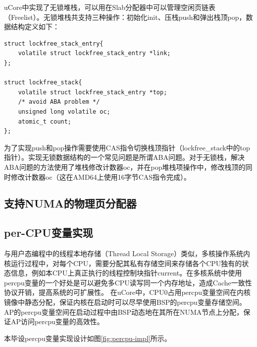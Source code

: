 uCore中实现了无锁堆栈，可以用在Slab分配器中可以管理空闲页链表（Freelist）。无锁堆栈共支持三种操作：初始化init、压栈push和弹出栈顶pop，数据结构定义如下：

\begin{lstlisting}
struct lockfree_stack_entry{
	volatile struct lockfree_stack_entry *link;
};

struct lockfree_stack{
	volatile struct lockfree_stack_entry *top;
	/* avoid ABA problem */
	unsigned long volatile oc;
	atomic_t count;
};
\end{lstlisting}

为了实现push和pop操作需要使用CAS指令切换栈顶指针（lockfree\_stack中的top指针）。实现无锁数据结构的一个常见问题是所谓ABA问题\cite{Fraser:2007:CPW:1233307.1233309}。对于无锁栈，解决ABA问题的方法使用了堆栈修改计数器oc，并在pop堆栈项操作中，修改栈顶的同时修改计数器oc（这在AMD64上使用16字节CAS指令完成）。

\subsection{支持NUMA的物理页分配器}

\subsection{per-CPU变量实现}
\label{subsec:percpu}

与用户态编程中的线程本地存储（Thread Local Storage）类似，多核操作系统内核运行过程中，对每个CPU，需要分配其私有存储空间来存储各个CPU独有的状态信息，例如本CPU上真正执行的线程控制块指针current。在多核系统中使用percpu变量的一个好处是可以避免多CPU读写同一个内存地址，造成Cache一致性协议开销，提高系统的可扩展性。
在uCore中，CPU0占用percpu变量空间在内核镜像中静态分配，保证内核在启动时可以尽早使用BSP的percpu变量存储空间。AP的percpu变量空间在启动过程中由BSP动态地在其所在NUMA节点上分配，保证AP访问percpu变量的高效性。

本毕设percpu变量实现设计如图\ref{fig:percpu-impl}所示。

